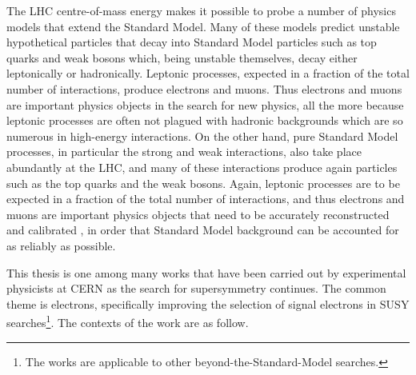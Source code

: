 The LHC centre-of-mass energy makes it possible to probe a number of physics
models that extend the Standard Model. Many of these models predict unstable
hypothetical particles that decay into Standard Model particles such as top
quarks and weak bosons which, being unstable themselves, decay either
leptonically or hadronically. Leptonic processes, expected in a fraction of the
total number of interactions, produce electrons and muons. Thus electrons and
muons are important physics objects in the search for new physics, all the more
because leptonic processes are often not plagued with hadronic backgrounds
which are so numerous in high-energy interactions. On the other hand, pure
Standard Model processes, in particular the strong and weak interactions, also
take place abundantly at the LHC, and many of these interactions produce again
particles such as the top quarks and the weak bosons. Again, leptonic processes
are to be expected in a fraction of the total number of interactions, and thus
electrons and muons are important physics objects that need to be accurately
reconstructed and calibrated , in order that Standard Model background can be
accounted for as reliably as possible.


This thesis is one among many works that have been carried out by experimental
physicists at CERN as the search for supersymmetry continues. The common theme
is electrons, specifically improving the selection of signal electrons in SUSY
searches\footnote{The works are applicable to other beyond-the-Standard-Model
	searches.}. The contexts of the work are as follow.


